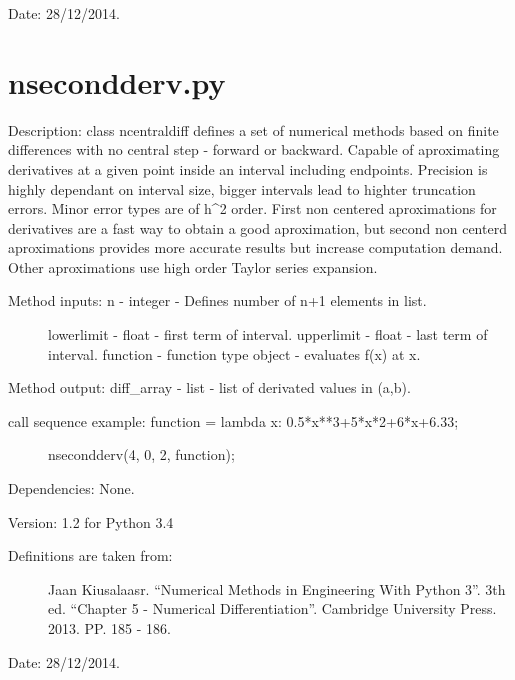 \documentclass[letterpaper,10pt,oneside]{sphinxmanual}
\theoremstyle{plain}%
\theoremstyle{definition}%
\theoremstyle{remark}%
\begin{document}
Date: 28/12/2014.


\section{nsecondderv.py}
\label{code:module-nsecondderv}\label{code:nsecondderv-py}
Description: class ncentraldiff defines a set of numerical methods based on
finite differences with no central step - forward or backward. Capable of
aproximating derivatives at a given point inside an interval including 
endpoints. Precision is highly dependant on interval size, bigger intervals
lead to highter truncation errors. Minor error types are of h\textasciicircum{}2 order. First
non centered aproximations for derivatives are a fast way to obtain a good
aproximation, but second non centerd aproximations provides more accurate
results but increase computation demand. Other aproximations use high order
Taylor series expansion.
\begin{description}
\item[{Method inputs: n - integer - Defines number of n+1 elements in list.}] \leavevmode
lowerlimit - float - first term of interval.
upperlimit - float - last term of interval.
function - function type object - evaluates f(x) at x.

\end{description}

Method output: diff\_array - list - list of derivated values in (a,b).
\begin{description}
\item[{call sequence example: function = lambda x: 0.5*x**3+5*x*2+6*x+6.33;}] \leavevmode
nsecondderv(4, 0, 2, function);

\end{description}

Dependencies: None.

Version: 1.2 for Python 3.4
\begin{description}
\item[{Definitions are taken from:}] \leavevmode
Jaan Kiusalaasr. ``Numerical Methods in Engineering With Python 3''.
3th ed. ``Chapter 5 - Numerical Differentiation''. 
Cambridge University Press. 2013. PP. 185 - 186.

\end{description}




Date: 28/12/2014.
\end{document}
